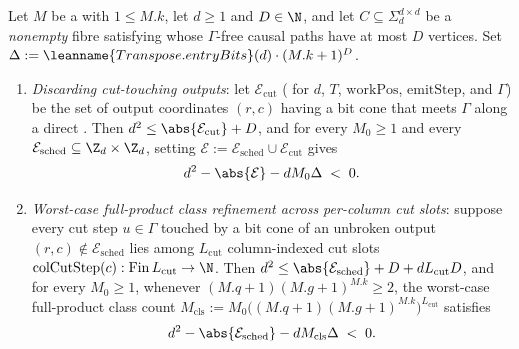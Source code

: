 \begin{proposition}\label{prop:negative-brackets}
Let $M$ be a  with $1 \le M.k$, let $d \ge 1$ and $D \in \N$, and let
$C \subseteq \Sigma_d^{d\times d}$ be a \emph{nonempty} fibre satisfying 
whose $\Gamma$-free causal paths have at most $D$ vertices. Set
$\Delta := \leanname{Transpose.entryBits}(d) \cdot (M.k + 1)^D$.
\begin{enumerate}[label=(\alph*)]
\item \emph{Discarding cut-touching outputs}: let $\mathcal{E}_{\mathrm{cut}}$
  ( for $d$, $T$, $\mathrm{workPos}$, $\mathrm{emitStep}$, and $\Gamma$)
  be the set of output coordinates $(r, c)$ having a bit cone that meets $\Gamma$ along a direct
  . Then $d^2 \le \abs{\mathcal{E}_{\mathrm{cut}}} + D$, and for every $M_0 \ge 1$
  and every $\mathcal{E}_{\mathrm{sched}} \subseteq \Z_d \times \Z_d$, setting
  $\mathcal{E} := \mathcal{E}_{\mathrm{sched}} \cup \mathcal{E}_{\mathrm{cut}}$ gives
  \[
    d^2 - \abs{\mathcal{E}} - d M_0 \Delta \;<\; 0.
  \]
\item \emph{Worst-case full-product class refinement across per-column cut slots}: suppose every cut
  step $u \in \Gamma$ touched by a bit cone of an unbroken output $(r, c) \notin \mathcal{E}_{\mathrm{sched}}$
  lies among $L_{\mathrm{cut}}$ column-indexed cut slots $\mathrm{colCutStep}(c) : \mathrm{Fin}\,L_{\mathrm{cut}} \to \N$.
  Then $d^2 \le \abs{\mathcal{E}_{\mathrm{sched}}} + D + d L_{\mathrm{cut}} D$, and for every
  $M_0 \ge 1$, whenever $(M.q + 1)(M.g + 1)^{M.k} \ge 2$, the worst-case full-product class count
  $M_{\mathrm{cls}} := M_0 \bigl((M.q + 1)(M.g + 1)^{M.k}\bigr)^{L_{\mathrm{cut}}}$ satisfies
  \[
    d^2 - \abs{\mathcal{E}_{\mathrm{sched}}} - d M_{\mathrm{cls}} \Delta \;<\; 0.
  \]
\end{enumerate}
\end{proposition}
